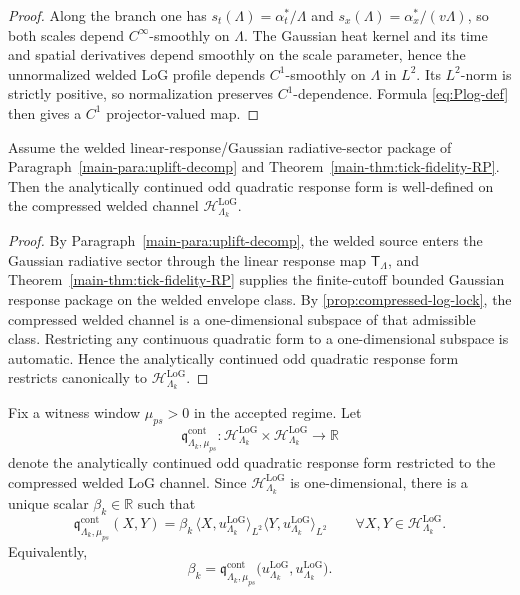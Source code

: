 \documentclass[11pt]{article}
\begin{document}
\begin{proof}
Along the branch one has
\(
s_t(\Lambda)=\alpha_t^\ast/\Lambda
\)
and
\(
s_x(\Lambda)=\alpha_x^\ast/(v\Lambda)
\),
so both scales depend \(C^\infty\)-smoothly on \(\Lambda\). The Gaussian heat kernel and its time and
spatial derivatives depend smoothly on the scale parameter, hence the unnormalized welded LoG profile
depends \(C^1\)-smoothly on \(\Lambda\) in \(L^2\). Its \(L^2\)-norm is strictly positive, so
normalization preserves \(C^1\)-dependence. Formula \eqref{eq:Plog-def} then gives a \(C^1\)
projector-valued map.
\end{proof}

\begin{proposition}
\label{prop:compressed-form-well-defined}
Assume the welded linear-response/Gaussian radiative-sector package of
Paragraph~\ref{main-para:uplift-decomp} and Theorem~\ref{main-thm:tick-fidelity-RP}. Then the
analytically continued odd quadratic response form is well-defined on the compressed welded channel
\(\mathcal H^{\mathrm{LoG}}_{\Lambda_k}\).
\end{proposition}

\begin{proof}
By Paragraph~\ref{main-para:uplift-decomp}, the welded source enters the Gaussian radiative sector
through the linear response map \(\mathsf T_\Lambda\), and Theorem~\ref{main-thm:tick-fidelity-RP}
supplies the finite-cutoff bounded Gaussian response package on the welded envelope class. By
\cref{prop:compressed-log-lock}, the compressed welded channel is a one-dimensional subspace of that
admissible class. Restricting any continuous quadratic form to a one-dimensional subspace is
automatic. Hence the analytically continued odd quadratic response form restricts canonically to
\(\mathcal H^{\mathrm{LoG}}_{\Lambda_k}\).
\end{proof}

\begin{definition}
\label{def:compressed-odd-coeff}
Fix a witness window \(\mu_{ps}>0\) in the accepted regime. Let
\[
\mathfrak q^{\mathrm{cont}}_{\Lambda_k,\mu_{ps}}
:
\mathcal H^{\mathrm{LoG}}_{\Lambda_k}\times \mathcal H^{\mathrm{LoG}}_{\Lambda_k}
\to
\mathbb R
\]
denote the analytically continued odd quadratic response form restricted to the compressed welded LoG
channel. Since \(\mathcal H^{\mathrm{LoG}}_{\Lambda_k}\) is one-dimensional, there is a unique scalar
\(\beta_k\in\mathbb R\) such that
\begin{equation}
\mathfrak q^{\mathrm{cont}}_{\Lambda_k,\mu_{ps}}(X,Y)
=
\beta_k\,
\langle X,u^{\mathrm{LoG}}_{\Lambda_k}\rangle_{L^2}
\langle Y,u^{\mathrm{LoG}}_{\Lambda_k}\rangle_{L^2}
\qquad
\forall X,Y\in\mathcal H^{\mathrm{LoG}}_{\Lambda_k}.
\label{eq:qcont-beta}
\end{equation}
Equivalently,
\[
\beta_k
=
\mathfrak q^{\mathrm{cont}}_{\Lambda_k,\mu_{ps}}
\big(
u^{\mathrm{LoG}}_{\Lambda_k},
u^{\mathrm{LoG}}_{\Lambda_k}
\big).
\]
\end{definition}
\end{document}
